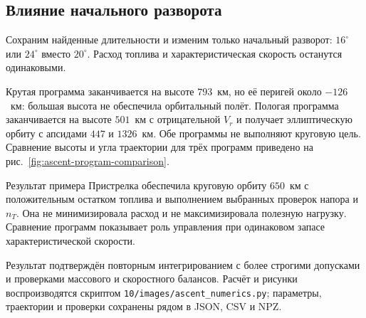 
\FloatBarrier
\subsection{Влияние начального разворота}

Сохраним найденные длительности и изменим только начальный разворот:
$16^\circ$ или $24^\circ$ вместо $20^\circ$.
Расход топлива и характеристическая скорость останутся одинаковыми.

Крутая программа заканчивается на высоте $793$~км,
но её перигей около $-126$~км: большая высота не обеспечила
орбитальный полёт. Пологая программа заканчивается на высоте
$501$~км с отрицательной $V_r$ и получает эллиптическую орбиту
с апсидами $447$ и $1326$~км. Обе программы не выполняют
круговую цель.
Сравнение высоты и угла траектории для трёх программ
приведено на рис.~\ref{fig:ascent-program-comparison}.


\begin{explanation}{Результат примера}
Пристрелка обеспечила круговую орбиту $650$~км с положительным
остатком топлива и выполнением выбранных проверок напора и $n_T$.
Она не минимизировала расход и не максимизировала полезную нагрузку.
Сравнение программ показывает роль управления при одинаковом
запасе характеристической скорости.
\end{explanation}

Результат подтверждён повторным интегрированием с более строгими
допусками и проверками массового и скоростного балансов.
Расчёт и рисунки воспроизводятся скриптом
\texttt{10/images/ascent\_numerics.py}; параметры, траектории и
проверки сохранены рядом в JSON, CSV и NPZ.
